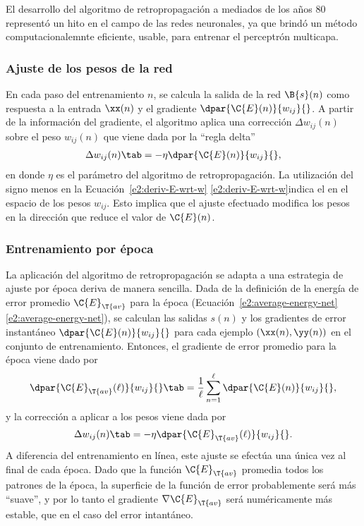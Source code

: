 El desarrollo del algoritmo de retropropagación a mediados de los años
80 representó un hito en el campo de las redes neuronales, ya
que brindó un método computacionalemnte eficiente, usable, para
entrenar el perceptrón multicapa.
%
\subsubsection{Ajuste de los pesos de la red}
%
En cada paso del entrenamiento $n$, se calcula la salida de la red
$\B{s}(n)$ como respuesta a la entrada $\xx(n)$ y el gradiente
$\dpar{\C{E}(n)}{w_{ij}}{}$. A partir de la información del gradiente,
el algoritmo aplica una corrección $\Delta{}w_{ij}(n)$ sobre el peso
$w_{ij}(n)$ que viene dada por la ``regla delta''
%
\begin{align}\label{e2:delta-rule}
  \Delta w_{ij}(n)\tab=-\eta\dpar{\C{E}(n)}{w_{ij}}{},
\end{align}
%
en donde $\eta$ es el parámetro  del
algoritmo de retropropagación. La utilización del signo menos en la
\iflatexml{}Ecuación~\ref{e2:deriv-E-wrt-w}
\else\autoref{e2:deriv-E-wrt-w}\fi indica el  en el espacio de los pesos $w_{ij}$. Esto implica que el
ajuste efectuado modifica los pesos en la dirección que reduce el
valor de $\C{E}(n)$.
%
\subsubsection{Entrenamiento por época}
%
La aplicación del algoritmo de retropropagación se adapta a una
estrategia de ajuste por época deriva de manera sencilla. Dada de la
definición de la energía de error promedio $\C{E}_{\T{av}}$ para la
época (\iflatexml{}Ecuación~\ref{e2:average-energy-net}\else\autoref{e2:average-energy-net}\fi),
se calculan las salidas $s(n)$ y los gradientes de error instantáneo
$\dpar{\C{E}(n)}{w_{ij}}{}$ para cada ejemplo $(\xx(n),\yy(n))$ en el
conjunto de entrenamiento. Entonces, el gradiente de error promedio
para la época viene dado por
%
\begin{align}\label{e2:deriv-Eav-wrt-w}
  \dpar{\C{E}_{\T{av}}(\ell)}{w_{ij}}{}\tab=
  \frac{1}{\ell}\sum_{n=1}^\ell\dpar{\C{E}(n)}{w_{ij}}{},
\end{align}
%
y la corrección a aplicar a los pesos viene dada por
%
\begin{align}\label{e2:delta-rule-epoch}
  \Delta w_{ij}(n)\tab=-\eta\dpar{\C{E}_{\T{av}}(\ell)}{w_{ij}}{}.
\end{align}
%
A diferencia del entrenamiento en línea, este ajuste se efectúa una
única vez al final de cada época. Dado que la función $\C{E}_{\T{av}}$
promedia todos los patrones de la época, la superficie de la función
de error probablemente será más ``suave'', y por lo tanto el gradiente
$\nabla\C{E}_{\T{av}}$ será numéricamente más estable, que en el caso
del error intantáneo.
%
